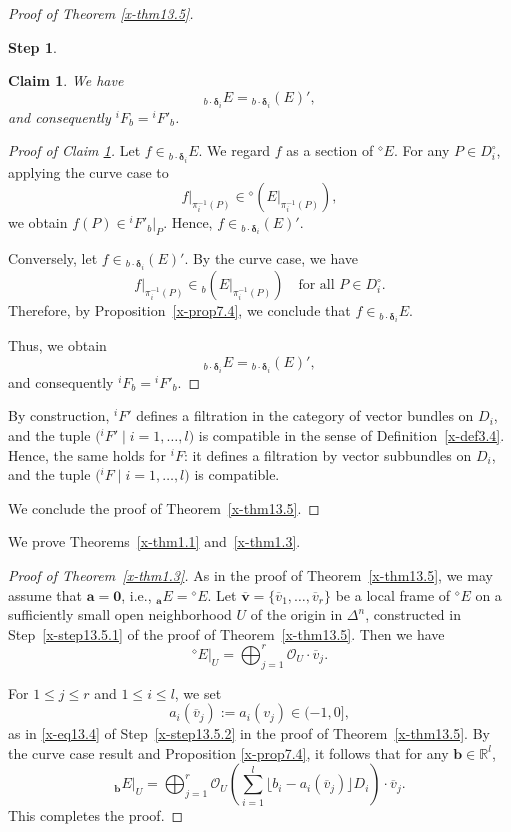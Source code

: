 \documentclass[12pt,twoside]{amsart}
\newtheorem{claim}[thm]{Claim}
\theoremstyle{definition}
\newtheorem{step}{Step}
\begin{document}
\begin{proof}[Proof of Theorem \ref{x-thm13.5}]
\begin{step}
\begin{claim}\label{x-claim13.8}
We have
\[
{}_{b\cdot \bm \delta_i} E
=
{}_{b\cdot \bm \delta_i}(E)',
\]
and consequently ${}^i\!F_b = {}^i\!F'_b$.
\end{claim}

\begin{proof}[Proof of Claim \ref{x-claim13.8}]
Let $f \in {}_{b\cdot \bm \delta_i} E$.
We regard $f$ as a section of ${}^\diamond\!E$.
For any $P\in D_i^\circ$, applying the curve case to
\[
f|_{\pi_i^{-1}(P)} \in
{}^\diamond\!(E|_{\pi_i^{-1}(P)}),
\]
we obtain
$f(P)\in {}^i\!F'_b|_P$.
Hence, $f\in {}_{b\cdot \bm \delta_i}(E)'$.

Conversely, let $f\in {}_{b\cdot \bm \delta_i}(E)'$.
By the curve case, we have
\[
f|_{\pi_i^{-1}(P)} \in {}_b(E|_{\pi_i^{-1}(P)})
\quad \text{for all } P\in D_i^\circ.
\]
Therefore, by Proposition~\ref{x-prop7.4},
we conclude that $f\in {}_{b\cdot \bm \delta_i} E$. 

Thus, we obtain 
\[
{}_{b\cdot \bm \delta_i} E = {}_{b\cdot \bm \delta_i}(E)',
\] 
and consequently ${}^i\!F_b = {}^i\!F'_b$. 
\end{proof}

By construction, ${}^i\!F'$ defines a filtration in the category of
vector bundles on $D_i$, and the tuple
$\bigl({}^i\!F' \mid i=1,\ldots,l\bigr)$
is compatible in the sense of Definition~\ref{x-def3.4}.
Hence, the same holds for ${}^i\!F$:
it defines a filtration by vector subbundles on $D_i$, and the tuple
$\bigl({}^i\!F \mid i=1,\ldots,l\bigr)$ is compatible.
\end{step}

We conclude the proof of Theorem~\ref{x-thm13.5}.
\end{proof}

We prove Theorems~\ref{x-thm1.1} and~\ref{x-thm1.3}.

\begin{proof}[Proof of Theorem~\ref{x-thm1.3}]
As in the proof of Theorem~\ref{x-thm13.5}, we may assume that
$\bm a=\bm 0$, i.e.,
${}_{\bm a}E={}^\diamond\!E$.
Let
$\overline{\bm v}=\{\overline v_1,\ldots,\overline v_r\}$
be a local frame of ${}^\diamond\!E$ on a sufficiently small
open neighborhood $U$ of the origin in $\Delta^n$,
constructed in Step~\ref{x-step13.5.1} of the proof of
Theorem~\ref{x-thm13.5}.
Then we have
\[
{}^\diamond\!E|_U
=\bigoplus_{j=1}^r \mathcal O_U \cdot \overline v_j.
\]

For $1\le j\le r$ and $1\le i\le l$, we set
\[
a_i(\overline v_j):=a_i(v_j)\in(-1,0],
\]
as in \eqref{x-eq13.4} of Step~\ref{x-step13.5.2} in the proof of
Theorem~\ref{x-thm13.5}.
By the curve case result and Proposition \ref{x-prop7.4}, 
it follows that for any
$\bm b\in\mathbb R^l$,
\[
{}_{\bm b}E|_U
=\bigoplus_{j=1}^r
\mathcal O_U\!\left(
\sum_{i=1}^l \lfloor b_i-a_i(\overline v_j)\rfloor D_i
\right)\cdot \overline v_j.
\]
This completes the proof.
\end{proof}
\end{document}
